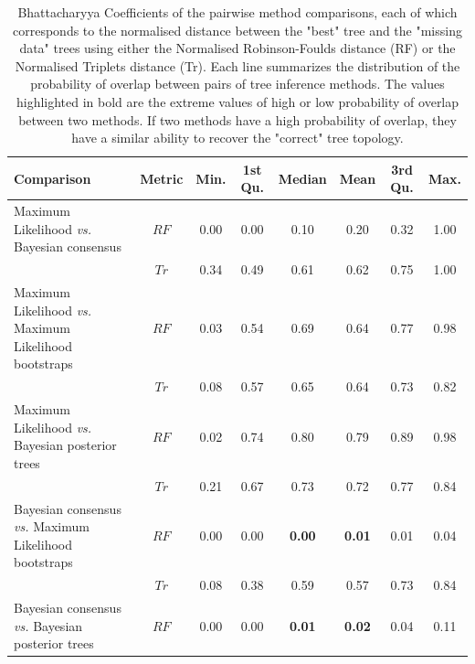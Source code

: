 \documentclass[12pt,letterpaper]{article}
\begin{document}
%    

\newpage

\begin{landscape}
\begin{table}[ht]
\caption{Bhattacharyya Coefficients of the pairwise method comparisons, each of which corresponds to the normalised distance between the "best" tree and the "missing data" trees using either the Normalised Robinson-Foulds distance (RF) or the Normalised Triplets distance (Tr). Each line summarizes the distribution of the probability of overlap between pairs of tree inference methods. The values highlighted in bold are the extreme values of high or low probability of overlap between two methods. If two methods have a high probability of overlap, they have a similar ability to recover the "correct" tree topology.}
\centering
\begin{tabular}{lccccccc}
  \hline
 Comparison &  Metric & Min. & 1st Qu. & Median & Mean & 3rd Qu. & Max. \\ 
  \hline
    Maximum Likelihood \textit{vs.} Bayesian consensus                 & $RF$ & 0.00 & 0.00 & 0.10 & 0.20 & 0.32 & 1.00 \\ 
                                                                       & $Tr$ & 0.34 & 0.49 & 0.61 & 0.62 & 0.75 & 1.00 \\ 
    Maximum Likelihood \textit{vs.} Maximum Likelihood bootstraps      & $RF$ & 0.03 & 0.54 & 0.69 & 0.64 & 0.77 & 0.98 \\ 
                                                                       & $Tr$ & 0.08 & 0.57 & 0.65 & 0.64 & 0.73 & 0.82 \\ 
    Maximum Likelihood \textit{vs.} Bayesian posterior trees           & $RF$ & 0.02 & 0.74 & 0.80 & 0.79 & 0.89 & 0.98 \\ 
                                                                       & $Tr$ & 0.21 & 0.67 & 0.73 & 0.72 & 0.77 & 0.84 \\ 
    Bayesian consensus \textit{vs.} Maximum Likelihood bootstraps      & $RF$ & 0.00 & 0.00 & \textbf{0.00} & \textbf{0.01} & 0.01 & 0.04 \\ 
                                                                       & $Tr$ & 0.08 & 0.38 & 0.59 & 0.57 & 0.73 & 0.84 \\ 
    Bayesian consensus \textit{vs.} Bayesian posterior trees           & $RF$ & 0.00 & 0.00 & \textbf{0.01} & \textbf{0.02} & 0.04 & 0.11 \\ 

\end{tabular}
\end{table}
\end{landscape}
\end{document}
